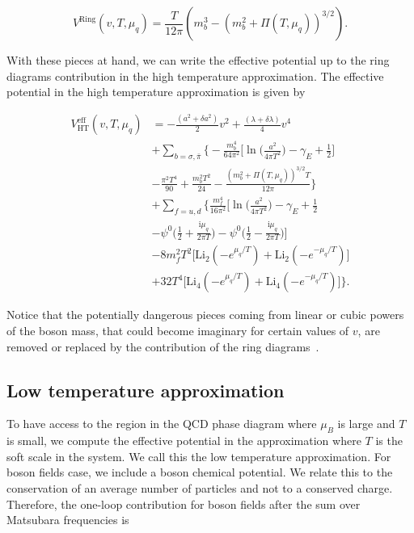 \documentclass[%
 reprint,
showpacs,preprintnumbers,
 amsmath,amssymb,
onecolumn]{revtex4}
\begin{document}
\begin{equation}
    V^{\text{Ring}}(v,T,\mu_q)=\frac{T}{12\pi}(m_b^3-(m_b^2+\Pi(T,\mu_q))^{3/2}).
    \label{finalrings}
\end{equation}

With these pieces at hand, we can write the effective potential up to the ring diagrams contribution in the high temperature approximation. The effective potential in the high temperature approximation is given by

\begin{align}
    V_{\text{HT}}^{\text{eff}}(v,T,\mu_q)&=-\frac{(a^2+\delta a^2)}{2}v^2
    +\frac{(\lambda+\delta \lambda)}{4}v^4\nonumber \\
    &+\sum_{b=\sigma,\bar{\pi}}\Big\{-\frac{m_b^4}{64\pi^2}\Big[ \ln \Big( \frac{ a^2}{4\pi T^2}\Big)-\gamma_E+\frac{1}{2} \Big]\nonumber \\
    &-\frac{\pi^2 T^4}{90}+\frac{m_b^2 T^2}{24}-\frac{(m_b^2+\Pi(T,\mu_q))^{3/2} T}{12\pi}\Big\}\nonumber \\
    &+\sum_{f=u,d}\Big\{\frac{m_f^4}{16\pi^2}\Big[ \ln \Big( \frac{ a^2}{4\pi T^2}\Big)-\gamma_E+\frac{1}{2}\nonumber \\
    &-\psi^0\Big( \frac{1}{2}+\frac{\text{i}\mu_q}{2\pi T} \Big)-\psi^0\Big( \frac{1}{2}-\frac{\text{i}\mu_q}{2\pi T} \Big)\Big]\nonumber \\
    &-8m_f^2T^2\Big[ \text{Li}_2(-e^{\mu_q/T})+\text{Li}_2(-e^{-\mu_q/T}) \Big]\nonumber \\
    &+32T^4\Big[ \text{Li}_4(-e^{\mu_q/T})+\text{Li}_4(-e^{-\mu_q/T}) \Big]\Big\}.
    \label{finalHTpotential}
\end{align}

Notice that the potentially dangerous pieces coming from linear or cubic powers of the boson mass, that could become imaginary for certain values of $v$, are removed or replaced by the contribution of the ring diagrams~\cite{DJ}.

\subsection{\label{sec:level6}Low temperature approximation}

To have access to the region in the QCD phase diagram where $\mu_B$ is large and $T$ is small, we compute the effective potential in the approximation where $T$ is the soft scale in the system. We call this the low temperature approximation. For boson fields case, we include a boson chemical potential. We relate this to the conservation of an average number of particles and not to a conserved charge. Therefore, the one-loop contribution for boson fields after the sum over Matsubara frequencies is
\end{document}
